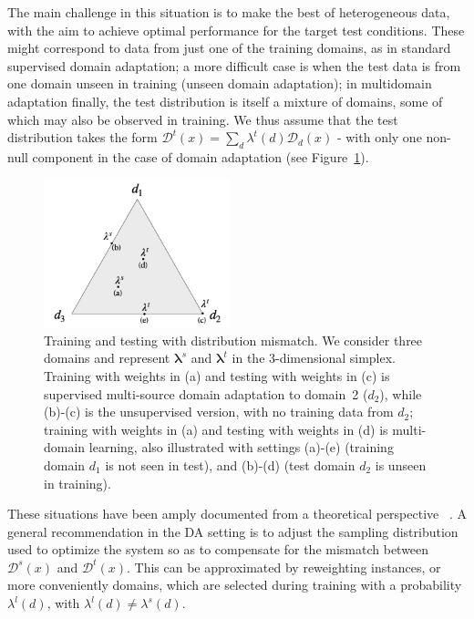 \documentclass[11pt]{article}
\newcommand{\vlambda}{\ensuremath{\boldsymbol\lambda}\xspace} %
\begin{document}
The main challenge in this situation is to make the best of heterogeneous data, with the aim to achieve optimal performance for the target test conditions. These might correspond to data from just one of the training domains, as in standard supervised domain adaptation; a more difficult case is when the test data is from one domain unseen in training (unseen domain adaptation); in multidomain adaptation finally, the test distribution is itself a mixture of domains, some of which may also be observed in training. We thus assume that the test distribution takes the form $\mathcal{D}^{t}(x) = \sum_d \lambda^{t}(d) \mathcal{D}_d(x)$ - with only one non-null  component in the case of domain adaptation (see Figure~\ref{fig:mdmt-lambdas}).
\begin{figure}[h]
  \centering
  \vspace{-\baselineskip}
  \includegraphics[width=0.48\textwidth]{mdmt-lambdas}
  \caption{Training and testing with distribution mismatch. We consider three domains and represent $\vlambda^{s}$ and $\vlambda^{t}$ in the 3-dimensional simplex. Training with weights in (a) and testing with weights in (c) is supervised multi-source domain adaptation to domain~2 ($d_2$), while (b)-(c) is the unsupervised version, with no training data from $d_2$; training with weights in (a) and testing with weights in (d) is multi-domain learning, also illustrated with settings (a)-(e) (training domain $d_1$ is not seen in test), and (b)-(d)  (test domain $d_2$ is unseen in training).}\label{fig:mdmt-lambdas}
\end{figure}

These situations have been amply documented from a theoretical perspective \ \cite{Mansour09multiple,Mansour09domainadaptation,Hoffman18algorithms}. A general recommendation in the DA setting is to adjust the sampling distribution used to optimize the system so as to compensate for the mismatch between $\mathcal{D}^s(x)$ and $\mathcal{D}^t(x)$. This can be approximated by reweighting instances, or more conveniently domains, which are selected during training with a probability $\lambda^{l}(d)$, with $\lambda^{l}(d) \neq \lambda^{s}(d)$.
\end{document}
